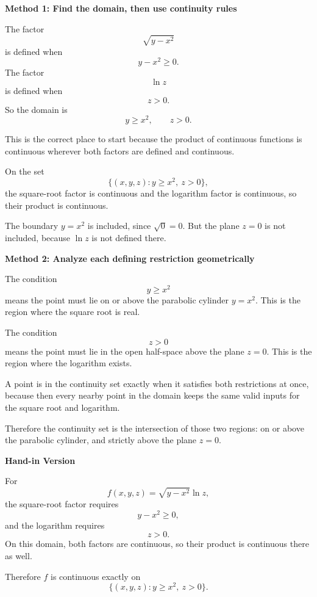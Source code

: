 \documentclass[a4paper,12pt,twocolumn]{article}
\newenvironment{solutionbox}{\begin{framed}}{\end{framed}}
\begin{document}
\begin{solutionbox}
\textbf{Method 1: Find the domain, then use continuity rules}

\begin{steps}
\item The factor
\[
\sqrt{y-x^2}
\]
is defined when
\[
y-x^2\ge 0.
\]
The factor
\[
\ln z
\]
is defined when
\[
z>0.
\]
So the domain is
\[
y\ge x^2,\qquad z>0.
\]

\item This is the correct place to start because the product of continuous functions is continuous wherever both factors are defined and continuous.

\item On the set
\[
\{(x,y,z): y\ge x^2,\ z>0\},
\]
the square-root factor is continuous and the logarithm factor is continuous, so their product is continuous.

\item The boundary \(y=x^2\) is included, since \(\sqrt{0}=0\). But the plane \(z=0\) is not included, because \(\ln z\) is not defined there.
\end{steps}
\end{solutionbox}

\begin{solutionbox}
\textbf{Method 2: Analyze each defining restriction geometrically}

\begin{steps}
\item The condition
\[
y\ge x^2
\]
means the point must lie on or above the parabolic cylinder \(y=x^2\). This is the region where the square root is real.

\item The condition
\[
z>0
\]
means the point must lie in the open half-space above the plane \(z=0\). This is the region where the logarithm exists.

\item A point is in the continuity set exactly when it satisfies both restrictions at once, because then every nearby point in the domain keeps the same valid inputs for the square root and logarithm.

\item Therefore the continuity set is the intersection of those two regions: on or above the parabolic cylinder, and strictly above the plane \(z=0\).
\end{steps}
\end{solutionbox}

\begin{solutionbox}
\textbf{Hand-in Version}

For
\[
f(x,y,z)=\sqrt{y-x^2}\ln z,
\]
the square-root factor requires
\[
y-x^2\ge 0,
\]
and the logarithm requires
\[
z>0.
\]
On this domain, both factors are continuous, so their product is continuous there as well.

Therefore \(f\) is continuous exactly on
\[
\boxed{\{(x,y,z): y\ge x^2,\ z>0\}.}
\]
\end{solutionbox}
\end{document}
